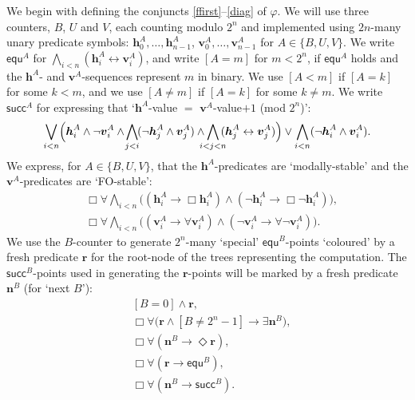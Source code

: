 \documentclass{lmcs} %
\theoremstyle{plain}\newtheorem{satz}[thm]{Satz} %
\newcommand{\fform}[1]{\boldsymbol{#1}}
\newcommand{\hvar}{\fform{h}}
\newcommand{\vvar}{\fform{v}}
\newcommand{\cA}{A}
\newcommand{\cR}{B}
\newcommand{\cU}{U}
\newcommand{\cV}{V}
\newcommand{\cvf}[3]{[{#1}\mathop{#2}{#3}]}
\newcommand{\nextR}{\fform{n}^\cR}
\newcommand{\Bv}{\forall}
\newcommand{\Bh}{\Box}
\newcommand{\Dv}{\exists}
\newcommand{\Dh}{\Diamond}
\newcommand{\start}{\fform{r}}
\newcommand{\grid}{\mathsf{equ}}
\newcommand{\scc}{\mathsf{succ}}
\begin{document}
	We begin with defining the conjuncts \eqref{ffirst}--\eqref{diag} of $\varphi$.
	We will use three counters, $\cR$, $\cU$ and $\cV$,
	each counting modulo $2^n$ and implemented using $2n$-many unary predicate symbols:
	$\hvar_0^\cA,\dots,\hvar_{n-1}^\cA$, $\vvar_0^\cA,\dots,\vvar_{n-1}^\cA$ for $\cA\in \{\cR,\cU,\cV\}$.
	We write $\grid^\cA$ for $\bigwedge_{i<n}(\hvar_i^\cA\leftrightarrow \vvar_i^\cA)$, and write
	$\cvf{\cA}{=}{m}$
	for $m<2^n$, if $\grid^\cA$ holds and the $\hvar^\cA$- and $\vvar^\cA$-sequences represent $m$ in binary. 
	We use $\cvf{\cA}{<}{m}$ if $\cvf{\cA}{=}{k}$ for some $k<m$, and we use
	$\cvf{\cA}{\ne}{m}$ if $\cvf{\cA}{=}{k}$ for some $k\not=m$. 
	We write $\scc^\cA$ for expressing that `$\hvar^\cA$-value $=$ $\vvar^\cA$-value$+1$ (mod $2^n$)':
	$$
	\bigvee_{i<n}\Bigl(\hvar_i^\cA\land \neg \vvar_i^\cA\land
	\!\bigwedge_{j<i}\!(\neg \hvar_j^\cA\land \vvar_j^\cA)\land
	\!\!\!\!\bigwedge_{i<j<n}\!\!\!(\hvar_j^\cA\leftrightarrow \vvar_j^\cA)\Bigr) 
	\lor \bigwedge_{i<n}(\neg\hvar_i^\cA\land\vvar_i^\cA).
	$$
	We express, for $\cA\in\{\cR,\cU,\cV\}$, that the $\hvar^\cA$-predicates are `modally-stable' and the $\vvar^\cA$-predicates are
	`FO-stable':
	\begin{align}
		\label{ffirst}
		& \Bh\Bv\bigwedge_{i<n}\bigl((\hvar_i^\cA\to\Bh \hvar_i^\cA)\land(\neg \hvar_i^\cA\to\Bh\neg \hvar_i^\cA)\bigr),\\
		\label{vstable}
		& \Bh\Bv\bigwedge_{i<n}\bigl((\vvar_i^\cA\to\Bv \vvar_i^\cA)\land(\neg \vvar_i^\cA\to\Bv\neg \vvar_i^\cA)\bigr).
	\end{align}
	We use the $\cR$-counter to generate $2^n$-many `special' $\grid^\cR$-points `coloured' by a fresh predicate $\start$ for the root-node of the trees representing the computation. The $\scc^\cR$-points used in generating the $\start$-points will be marked by a fresh predicate $\nextR$ (for `next $\cR$'):
	\begin{align}
		\label{root}
		& \cvf{\cR}{=}{0}\land\start,\\
		& \Bh\Bv \bigl(\start\land\cvf{\cR}{\ne}{2^n-1}\to \Dv\nextR\bigr),\\
		\label{flast}
		& \Bh\Bv (\nextR\to\Dh\start),\\
%	
		& \Bh\Bv(\start\to\grid^\cR),\\
		\label{genlast}
		& \Bh\Bv(\nextR\to\scc^\cR).
	\end{align}
\end{document}
